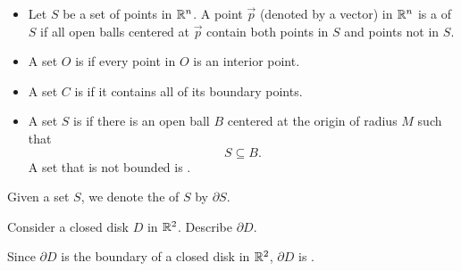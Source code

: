 \documentclass{ximera}
\begin{document}
\begin{definition}
\begin{itemize}
  \item Let $S$ be a set of points in $\mathbb R^n$. A point $\vec{p}$ (denoted by a vector) in $\mathbb R^n$ is
    a  of $S$ if all open balls centered at $\vec{p}$
    contain both points in $S$ and points not in $S$.
    \begin{image}
  \end{image}
  \item A set $O$ is  if every point in $O$ is an interior
    point.
    \begin{image}
    \end{image}
  \item A set $C$ is  if it contains all of its boundary
    points.
    \begin{image}
    \end{image}
  \item A set $S$ is  if there is an open ball $B$
    centered at the origin of radius $M$ such that
    \[
    S\subseteq B.
    \]
    A set that is not bounded is .
  \end{itemize}
  Given a set $S$, we denote the  of $S$ by
    $\partial S$.
\end{definition}


\begin{example}
  Consider a closed disk $D$ in $\mathbb R^2$. Describe $\partial D$.%
  \begin{explanation}
    Since $\partial D$ is the boundary of a closed disk in $\mathbb R^2$, $\partial D$ is .
  \end{explanation}
\end{example}
\end{document}
